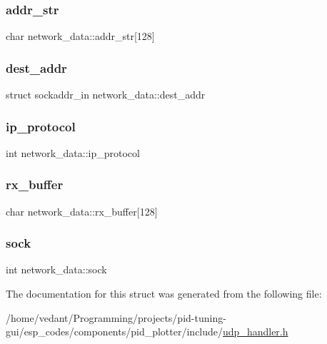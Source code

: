 \subsubsection{\texorpdfstring{addr\+\_\+str}{addr\_str}}
{\footnotesize\ttfamily char network\+\_\+data\+::addr\+\_\+str\mbox{[}128\mbox{]}}

\mbox{\label{structnetwork__data_a553d72b8506e9098215451adffd330d4}} 
\subsubsection{\texorpdfstring{dest\+\_\+addr}{dest\_addr}}
{\footnotesize\ttfamily struct sockaddr\+\_\+in network\+\_\+data\+::dest\+\_\+addr}

\mbox{\label{structnetwork__data_a2e35f88440947101eeeb8dc91a43d5e5}} 
\subsubsection{\texorpdfstring{ip\+\_\+protocol}{ip\_protocol}}
{\footnotesize\ttfamily int network\+\_\+data\+::ip\+\_\+protocol}

\mbox{\label{structnetwork__data_a9346e7a82edd41c346d1528ef301469b}} 
\subsubsection{\texorpdfstring{rx\+\_\+buffer}{rx\_buffer}}
{\footnotesize\ttfamily char network\+\_\+data\+::rx\+\_\+buffer\mbox{[}128\mbox{]}}

\mbox{\label{structnetwork__data_ab056807bd5bb97ce18f27e6b233de0b3}} 
\subsubsection{\texorpdfstring{sock}{sock}}
{\footnotesize\ttfamily int network\+\_\+data\+::sock}



The documentation for this struct was generated from the following file\+:\begin{DoxyCompactItemize}
\item 
/home/vedant/\+Programming/projects/pid-\/tuning-\/gui/esp\+\_\+codes/components/pid\+\_\+plotter/include/\hyperlink{udp__handler_8h}{udp\+\_\+handler.\+h}\end{DoxyCompactItemize}
